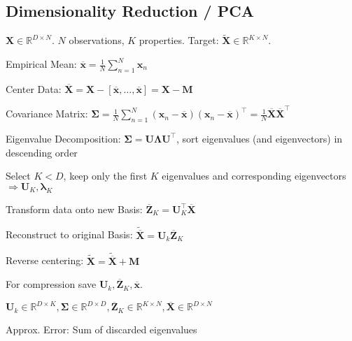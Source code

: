 \documentclass[a4paper, 11pt, landscape]{article}
\begin{document}
\begin{multicols*}{3}
\section{Dimensionality Reduction / PCA}
$\mathbf{X} \in \mathbb{R}^{D \times N}$. $N$ observations, $K$ properties. Target: $\tilde{\mathbf{X}} \in \mathbb{R}^{K \times N}$.
\begin{compactenum}
	\item Empirical Mean: $\overline{\mathbf{x}} = \frac{1}{N} \sum_{n=1}^N \mathbf{x}_n$
	\item Center Data: $\overline{\mathbf{X}} = \mathbf{X} - [\overline{\mathbf{x}}, \ldots, \overline{\mathbf{x}}] = \mathbf{X} - \mathbf{M}$
	\item Covariance Matrix: $\boldsymbol{\Sigma} = \frac{1}{N	} \sum_{n=1}^N (\mathbf{x}_n - \overline{\mathbf{x}}) (\mathbf{x}_n - \overline{\mathbf{x}})^\top = \frac{1}{N} \overline{\mathbf{X}}\overline{\mathbf{X}}^\top$
	\item Eigenvalue Decomposition: $\boldsymbol{\Sigma} = \mathbf{U} \boldsymbol{\Lambda} \mathbf{U}^\top$, sort eigenvalues (and eigenvectors) in descending order
	\item Select $K < D$, keep only the first $K$ eigenvalues and corresponding eigenvectors $\Rightarrow \mathbf{U}_K, \boldsymbol{\lambda}_K$
	\item Transform data onto new Basis: $\overline{\mathbf{Z}}_K = \mathbf{U}_K^\top \overline{\mathbf{X}}$
	\item Reconstruct to original Basis: $\tilde{\overline{\mathbf{X}}} = \mathbf{U}_k \overline{\mathbf{Z}}_K$
	\item Reverse centering: $\tilde{\mathbf{X}} = \tilde{\overline{\mathbf{X}}} + \mathbf{M}$
\end{compactenum}

\begin{compactitem}
	\item For compression save $\mathbf{U}_k, \overline{\mathbf{Z}}_K, \overline{\mathbf{x}}$.
	\item $\mathbf{U}_k \in \mathbb{R}^{D \times K}, \boldsymbol{\Sigma} \in \mathbb{R}^{D \times D}, \overline{\mathbf{Z}}_K \in \mathbb{R}^{K \times N}, \overline{\mathbf{X}} \in \mathbb{R}^{D \times N}$
\end{compactitem}

\begin{compactdesc}
	\item[Approx. Error:] Sum of discarded eigenvalues
\end{compactdesc}


\end{multicols*}
\end{document}
